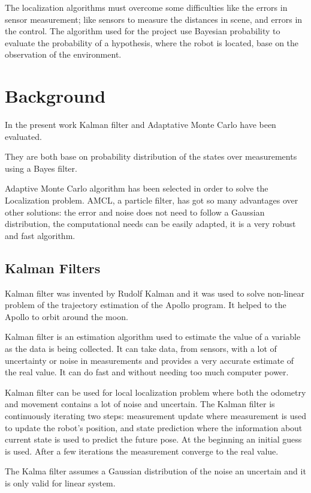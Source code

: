 \documentclass[10pt,journal,compsoc]{IEEEtran}
\begin{document}
The localization algorithms must overcome some difficulties like the errors in sensor measurement; like sensors to measure the distances in scene, and errors in the control. The algorithm used for the project use Bayesian probability to evaluate the probability of a hypothesis, where the robot is located, base on the observation of the environment.

\section{Background}
In the present work Kalman filter and Adaptative Monte Carlo have been evaluated. 

They are both base on probability distribution of the states over measurements using a Bayes filter. 

Adaptive Monte Carlo algorithm has been selected in order to solve the Localization problem. AMCL, a particle filter, has got so many advantages over other solutions: the error and noise does not need to follow a Gaussian distribution, the computational needs can be easily adapted, it is a very robust and fast algorithm.\cite{lamport1994latex}
\subsection{Kalman Filters}

Kalman filter was invented by Rudolf Kalman and it was used to solve non-linear problem of the trajectory estimation of the Apollo program. It helped to the Apollo to orbit around the moon. 

Kalman filter is an estimation algorithm used to estimate the value of a variable as the data is being collected. It can take data, from sensors, with a lot of uncertainty or noise in measurements and provides a very accurate estimate of the real value. It can do fast and without needing too much computer power. 

Kalman filter can be used for local localization problem where both the odometry and movement contains a lot of noise and uncertain. The Kalman filter is continuously iterating two steps: measurement update where measurement is used to update the robot's position, and state prediction where the information about current state is used to predict the future pose. At the beginning an initial guess is used. After a few iterations the measurement converge to the real value.

The Kalma filter assumes a Gaussian distribution of the noise an uncertain and it is only valid for linear system.
\end{document}
